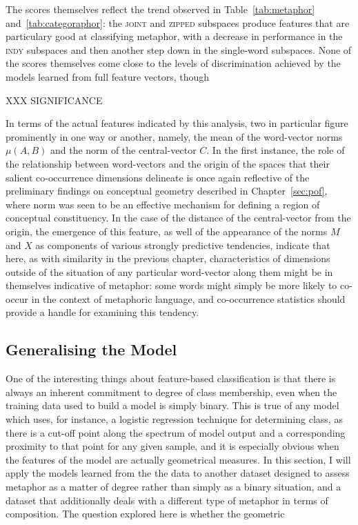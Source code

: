 The scores themselves reflect the trend observed in Table~\ref{tab:metaphor} and~\ref{tab:categoraphor}: the \textsc{joint} and \textsc{zipped} subspaces produce features that are particulary good at classifying metaphor, with a decrease in performance in the \textsc{indy} subspaces and then another step down in the single-word subspaces.  None of the scores themselves come close to the levels of discrimination achieved by the models learned from full feature vectors, though

XXX SIGNIFICANCE

In terms of the actual features indicated by this analysis, two in particular figure prominently in one way or another, namely, the mean of the word-vector norms $\mu(A,B)$ and the norm of the central-vector $C$.  In the first instance, the role of the relationship between word-vectors and the origin of the spaces that their salient co-occurrence dimensions delineate is once again reflective of the preliminary findings on conceptual geometry described in Chapter~\ref{sec:pof}, where norm was seen to be an effective mechanism for defining a region of conceptual constituency.  In the case of the distance of the central-vector from the origin, the emergence of this feature, as well of the appearance of the norms $M$ and $X$ as components of various strongly predictive tendencies, indicate that here, as with similarity in the previous chapter, characteristics of dimensions outside of the situation of any particular word-vector along them might be in themselves indicative of metaphor: some words might simply be more likely to co-occur in the context of metaphoric language, and co-occurrence statistics should provide a handle for examining this tendency.

\subsection{Generalising the Model} \label{sec:genaphor}
One of the interesting things about feature-based classification is that there is always an inherent commitment to degree of class membership, even when the training data used to build a model is simply binary.  This is true of any model which uses, for instance, a logistic regression technique for determining class, as there is a cut-off point along the spectrum of model output and a corresponding proximity to that point for any given sample, and it is especially obvious when the features of the model are actually geometrical measures.  In this section, I will apply the models learned from the the \cite{GutierrezEA2016} data to another dataset designed to assess metaphor as a matter of degree rather than simply as a binary situation, and a dataset that additionally deals with a different type of metaphor in terms of composition.  The question explored here is whether the geometric 

